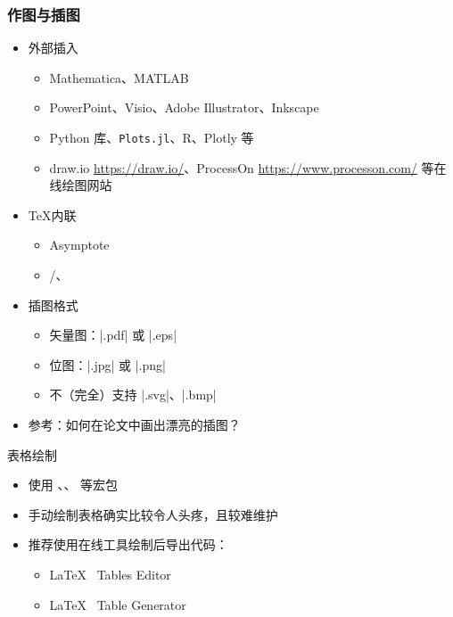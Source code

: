       \begin{frame}[fragile]
        \frametitle{作图与插图}
        \begin{itemize}
          \item 外部插入
      
            \begin{itemize}
              \item Mathematica、MATLAB
              \item PowerPoint、Visio、Adobe Illustrator、Inkscape
              \item Python  库、\texttt{Plots.jl}、R、Plotly 等
              \item draw.io \url{https://draw.io/}、ProcessOn \url{https://www.processon.com/} 等在线绘图网站
            \end{itemize}
      
          \item \TeX 内联
      
            \begin{itemize}
              \item Asymptote
              \item \alert{/、}
            \end{itemize}
      
          \item 插图格式
      
            \begin{itemize}
              \item 矢量图：|.pdf| 或 |.eps|
              \item 位图：|.jpg| 或 |.png|
              \item 不（完全）支持 |.svg|、|.bmp|
            \end{itemize}
      
          \item 参考：如何在论文中画出漂亮的插图？
        \end{itemize}
      \end{frame}
      
      \begin{frame}[fragile]{表格绘制}
        \begin{itemize}
          \item 使用 、、 等宏包
          \item 手动绘制表格确实比较令人头疼，且较难维护
          \item 推荐使用在线工具绘制后导出代码：
            \begin{itemize}
              \item \LaTeX{} \ Tables Editor 
              \item \LaTeX{} \ Table Generator 
            \end{itemize}
        \end{itemize}
      \end{frame}
      
